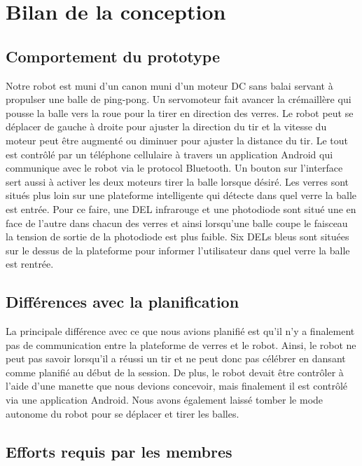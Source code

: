 \section{Bilan de la conception}

\subsection{Comportement du prototype}

Notre robot est muni d’un canon muni d’un moteur DC sans balai servant à propulser une balle de ping-pong.
Un servomoteur fait avancer la crémaillère qui pousse la balle vers la roue pour la tirer en direction des verres.
Le robot peut se déplacer de gauche à droite pour ajuster la direction du tir et la vitesse du moteur peut être augmenté ou diminuer pour ajuster la distance du tir.
Le tout est contrôlé par un téléphone cellulaire à travers un application Android qui communique avec le robot via le protocol Bluetooth.
Un bouton sur l’interface sert aussi à activer les deux moteurs tirer la balle lorsque désiré.
Les verres sont situés plus loin sur une plateforme intelligente qui détecte dans quel verre la balle est entrée.
Pour ce faire, une DEL infrarouge et une photodiode sont situé une en face de l’autre dans chacun des verres et ainsi lorsqu’une balle coupe le faisceau la tension de sortie de la photodiode est plus faible.
Six DELs bleus sont situées sur le dessus de la plateforme pour informer l’utilisateur dans quel verre la balle est rentrée.

\subsection{Différences avec la planification}

La principale différence avec ce que nous avions planifié est qu’il n’y a finalement pas de communication entre la plateforme de verres et le robot.
Ainsi, le robot ne peut pas savoir lorsqu’il a réussi un tir et ne peut donc pas célébrer en dansant comme planifié au début de la session.
De plus, le robot devait être contrôler à l’aide d’une manette que nous devions concevoir, mais finalement il est contrôlé via une application Android.
Nous avons également laissé tomber le mode autonome du robot pour se déplacer et tirer les balles.

\subsection{Efforts requis par les membres}

